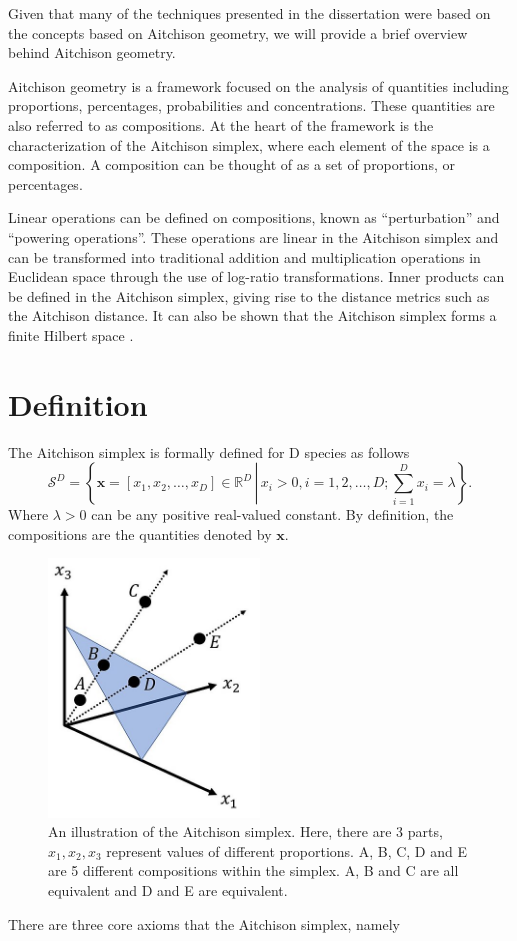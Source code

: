 Given that many of the techniques presented in the dissertation were based on the concepts based on Aitchison geometry, we will provide a brief overview behind Aitchison geometry.

Aitchison geometry is a framework focused on the analysis of quantities including proportions, percentages, probabilities and concentrations.  These quantities are also referred to as compositions.  At the heart of the framework is the characterization of the Aitchison simplex, where each element of the space is a composition.  A composition can be thought of as a set of proportions, or percentages.

Linear operations can be defined on compositions, known as ``perturbation'' and ``powering operations''.  These operations are linear in the Aitchison simplex and can be transformed into traditional addition and multiplication operations in Euclidean space through the use of log-ratio transformations.  Inner products can be defined in the Aitchison simplex, giving rise to the distance metrics such as the Aitchison distance.  It can also be shown that the Aitchison simplex forms a finite Hilbert space \cite{Pawlowsky-Glahn2015-qb}.

\section{Definition}
The Aitchison simplex is formally defined for D species as follows
\[\mathcal{S}^D=\left\{\mathbf{x}=[x_1,x_2,\dots,x_D]\in\mathbb{R}^D \,\left|\, x_i>0,i=1,2,\dots,D; \sum_{i=1}^D x_i=\lambda \right. \right\}. \]
Where $\lambda>0$ can be any positive real-valued constant.  By definition, the compositions are the quantities denoted by $\mathbf{x}$.

 \begin{figure}[H]
         \centering
         \includegraphics[width=0.5\textwidth]{appendix_c/Aitchison-simplex.jpg}
         \caption[An illustration of the Aitchison simplex.]
                 {An illustration of the Aitchison simplex.  Here, there are 3 parts, $x_1, x_2,  x_3$ represent values of different proportions.  A, B, C, D and E are 5 different compositions within the simplex.  A, B and C are all equivalent and D and E are equivalent.}
         \label{figcS1}
 \end{figure}
There are three core axioms that the Aitchison simplex, namely

